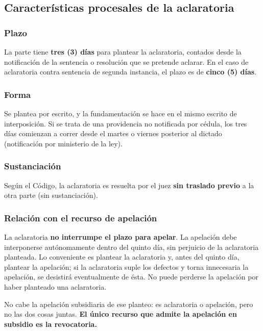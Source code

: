 \documentclass[12pt,oneside]{book}
\begin{document}
\subsection{Características procesales de la aclaratoria}

\subsubsection{Plazo}

La parte tiene \textbf{tres (3) días} para plantear la aclaratoria, contados desde la notificación de la sentencia o resolución que se pretende aclarar. En el caso de aclaratoria contra sentencia de segunda instancia, el plazo es de \textbf{cinco (5) días}.

\subsubsection{Forma}

Se plantea por escrito, y la fundamentación se hace en el mismo escrito de interposición. Si se trata de una providencia no notificada por cédula, los tres días comienzan a correr desde el martes o viernes posterior al dictado (notificación por ministerio de la ley).

\subsubsection{Sustanciación}

Según el Código, la aclaratoria es resuelta por el juez \textbf{sin traslado previo} a la otra parte (sin sustanciación).

\subsubsection{Relación con el recurso de apelación}

\begin{important}
La aclaratoria \textbf{no interrumpe el plazo para apelar}. La apelación debe interponerse autónomamente dentro del quinto día, sin perjuicio de la aclaratoria planteada. Lo conveniente es plantear la aclaratoria y, antes del quinto día, plantear la apelación; si la aclaratoria suple los defectos y torna innecesaria la apelación, se desistirá eventualmente de ésta. No puede perderse la apelación por haber planteado una aclaratoria.

No cabe la apelación subsidiaria de ese planteo: es aclaratoria o apelación, pero no las dos cosas juntas. \textbf{El único recurso que admite la apelación en subsidio es la revocatoria.}
\end{important}
\end{document}
